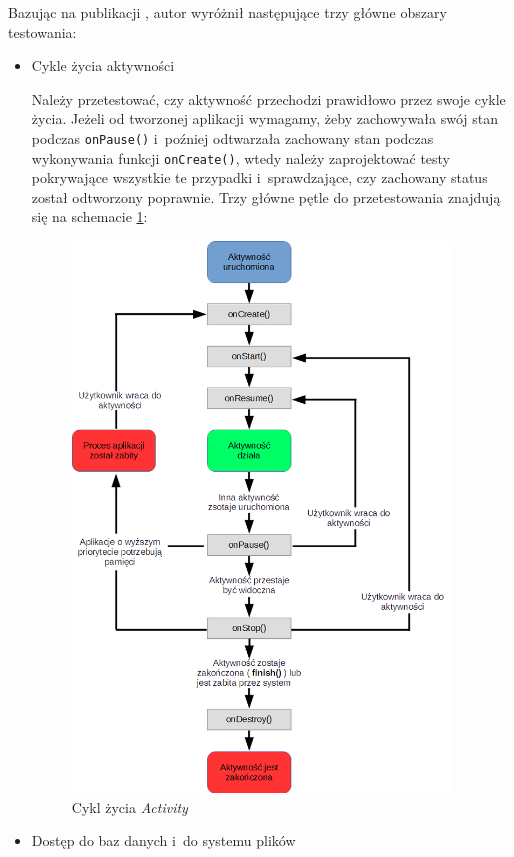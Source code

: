Bazując na publikacji \cite{bib:android:testing:learning}, autor wyróżnił następujące trzy główne obszary testowania:

\begin{itemize}
\item{Cykle życia aktywności}

Należy przetestować, czy aktywność przechodzi prawidłowo przez swoje cykle życia. Jeżeli od tworzonej aplikacji wymagamy, żeby zachowywała swój stan podczas \texttt{onPause()} i~poźniej odtwarzała zachowany stan podczas wykonywania funkcji \texttt{onCreate()}, wtedy należy zaprojektować testy pokrywające wszystkie te przypadki i~sprawdzające, czy zachowany status został odtworzony poprawnie. Trzy główne pętle do przetestowania znajdują się na schemacie \ref{fig:sample_figure}:
\begin{figure}[!htb]
    \centering
    \includegraphics[width=10cm]{imgs/ch2_activity_lifecycle.png}
    \caption{Cykl życia \textit{Activity}\cite{website:android:aktywnosci}}
    \label{fig:sample_figure}
\end{figure} 


\item{Dostęp do baz danych i~do systemu plików}


\end{itemize}
